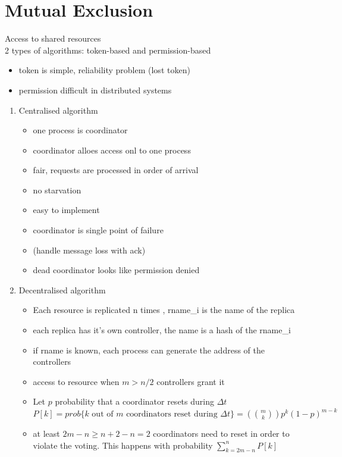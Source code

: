 \documentclass[ngerman,a4paper]{report}
\begin{document}
\section{Mutual Exclusion}
Access to shared resources\\
2 types of algorithms: token-based and permission-based
\begin{itemize}
	\item token is simple, reliability problem (lost token)
	\item permission difficult in distributed systems
\end{itemize}

\begin{enumerate}
	\item Centralised algorithm\\
		\begin{itemize}
			\item one process is coordinator
			\item coordinator alloes access onl to one process
			\item fair, requests are processed in order of arrival
			\item no starvation
			\item easy to implement
			\item coordinator is single point of failure
			\item (handle message loss with ack)
			\item dead coordinator looks like permission denied
		\end{itemize}
	\item Decentralised algorithm
		\begin{itemize}
			\item Each resource is replicated n times , rname\_i is the name of the replica\\
			\item each replica has it's own controller, the name is a hash of the rname\_i
			\item if rname is known, each process can generate the address of the controllers				
			\item access to resource when $m>n/2$ controllers grant it
			\item Let $p$ probability that a coordinator resets during $\Delta t$\\
				$P[k]= prob\lbrace k \text{ out of } m \text{ coordinators reset during } \Delta t\rbrace = \left( \binom{m}{k}\right) p^k (1-p)^{m-k}$
			\item at least $2m-n\geq n+2-n=2$ coordinators need to reset in order to violate the voting. This happens with probability $\sum\limits_{k=2m-n}^n P[k]$\\

\end{itemize}
\end{enumerate}
\end{document}
